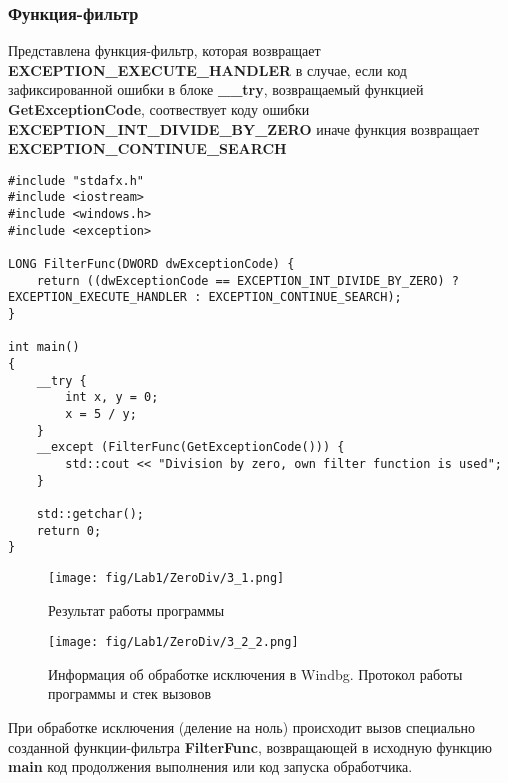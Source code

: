 \subsubsection{Функция-фильтр}
Представлена функция-фильтр, которая возвращает \textbf{EXCEPTION\_EXECUTE\_HANDLER} в случае, если код зафиксированной ошибки в блоке \textbf{\_\_try}, возвращаемый функцией \textbf{GetExceptionCode}, соотвествует коду ошибки \textbf{EXCEPTION\_INT\_DIVIDE\_BY\_ZERO} иначе функция возвращает
\textbf{EXCEPTION\_CONTINUE\_SEARCH}

\begin{lstlisting}[caption=Реализия функции-фильтра]
#include "stdafx.h"
#include <iostream>
#include <windows.h>
#include <exception>

LONG FilterFunc(DWORD dwExceptionCode) {
    return ((dwExceptionCode == EXCEPTION_INT_DIVIDE_BY_ZERO) ? EXCEPTION_EXECUTE_HANDLER : EXCEPTION_CONTINUE_SEARCH);
}

int main()
{
    __try {
        int x, y = 0;
        x = 5 / y;
    }
    __except (FilterFunc(GetExceptionCode())) {
        std::cout << "Division by zero, own filter function is used";
    }

    std::getchar();
    return 0;
}
\end{lstlisting}

\begin{figure}[H]
    \begin{center}
        \texttt{[image: fig/Lab1/ZeroDiv/3\_1.png]}
        \caption{Результат работы программы}
        \label{pic:3_1}
    \end{center}
\end{figure}

\begin{figure}[H]
    \begin{center}
        \texttt{[image: fig/Lab1/ZeroDiv/3\_2\_2.png]}
        \caption{Информация об обработке исключения в Windbg. Протокол работы программы и стек вызовов}
        \label{pic:3_2_2}
    \end{center}
\end{figure}

При обработке исключения (деление на ноль) происходит вызов специально созданной функции-фильтра \textbf{FilterFunc}, возвращающей в исходную функцию \textbf{main} код продолжения выполнения или код запуска обработчика.


